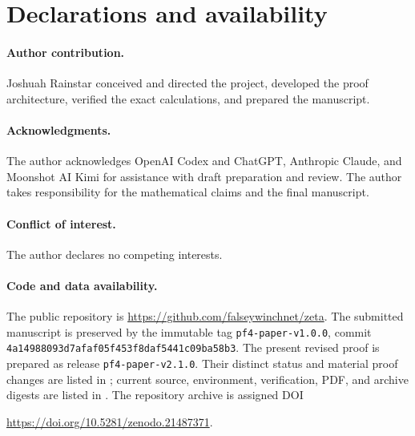 \section{Declarations and availability}

\paragraph{Author contribution.}
Joshuah Rainstar conceived and directed the project, developed the proof
architecture, verified the exact calculations, and prepared the manuscript.

\paragraph{Acknowledgments.}
The author acknowledges OpenAI Codex and ChatGPT, Anthropic Claude, and
Moonshot AI Kimi for assistance with draft preparation and review. The author
takes responsibility for the mathematical claims and the final manuscript.

\paragraph{Conflict of interest.}
The author declares no competing interests.

\paragraph{Code and data availability.}
The public repository is
\url{https://github.com/falseywinchnet/zeta}. The submitted manuscript is
preserved by the immutable tag \texttt{pf4-paper-v1.0.0}, commit
{\footnotesize\texttt{4a14988093d7afaf05f453f8daf5441c09ba58b3}}. The present revised proof is
prepared as release \texttt{pf4-paper-v2.1.0}.
Their distinct status and material proof changes are listed in
; current source, environment, verification,
PDF, and archive digests are listed in . The
repository archive is assigned DOI
\begin{center}
\url{https://doi.org/10.5281/zenodo.21487371}.
\end{center}
